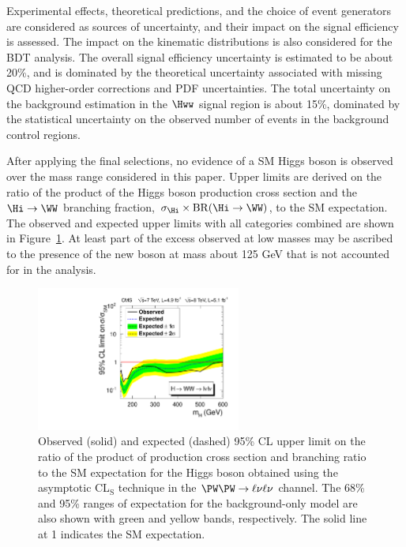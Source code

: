 Experimental effects, theoretical predictions, and the choice of event generators are considered as sources of
uncertainty, and their impact on the signal efficiency is assessed. The impact on the kinematic distributions is also considered for the BDT analysis. The overall signal efficiency uncertainty is estimated to be about 20\%, and is
dominated by the theoretical uncertainty associated with missing QCD higher-order corrections and PDF uncertainties. The total uncertainty on the background estimation in the $\Hww$ signal region is about 15\%, dominated by the
statistical uncertainty on the observed number of events in the background control regions.

After applying the final selections, no evidence of a SM Higgs boson is observed over the mass range considered in this paper. Upper limits are derived on the ratio of the product of the Higgs boson production cross section and the $\Hi \to \WW$ branching fraction, $\sigma_{\Hi} \times \mathrm{BR}(\Hi \to \WW)$, to the SM expectation. The observed and expected upper limits with all categories combined are shown in Figure~\ref{fig:hwwlvlvlim}. At least part of the excess observed at
low masses may be ascribed to the presence of the new boson at mass about 125 GeV that is not accounted for in the analysis.

\begin{figure}[htbp]
  \centering
  \includegraphics[width=0.6\textwidth]{figures/WW2l2nuLimit.pdf}
  \caption{\label{fig:hwwlvlvlim}Observed (solid) and expected
    (dashed) 95\% CL upper limit on the ratio of the product of production cross
    section and branching ratio to the SM expectation for the Higgs boson obtained using
    the asymptotic CL${}_{\textrm{S}}$ technique in the $\PW\PW \to \ell\nu\ell\nu$ channel. The 68\% and 95\%
    ranges of expectation for the background-only model are also shown
    with green and yellow bands, respectively. The solid line at 1
    indicates the SM expectation.} 
\end{figure}

